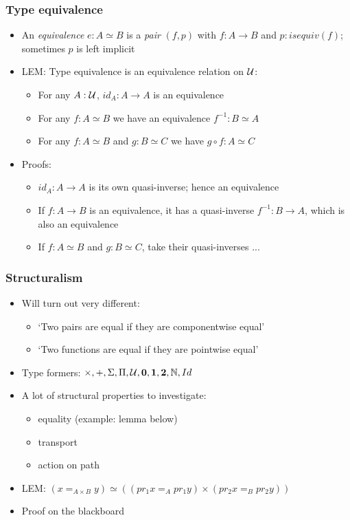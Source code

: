 \documentclass[handout]{beamer}
\newcommand{\Nat}{\mathbb{N}}
\newcommand{\UU}{{\cal U}}
\newcommand{\bfnull}{\mathbf{0}}
\newcommand{\bfone}{\mathbf{1}}
\newcommand{\bftwo}{\mathbf{2}}
\newcommand{\opp}[1]{\mathord{{#1}^{-1}}}
\begin{document}
\frame
  {

    \frametitle{Type equivalence}

    \begin{itemize}[<+->]
   \item An \emph{equivalence} $e:A\simeq B$ is a \emph{pair}
         $(f,p)$ with $f:A\to B$ and $p:isequiv(f)$; sometimes $p$ is left implicit
   \item LEM: Type equivalence is an equivalence relation on $\UU$:
      \begin{itemize}[<+->]
      \item For any $A:\UU$, $id_A: A\to A$ is an equivalence
      \item For any $f:A\simeq B$ we have an equivalence $\opp f:B\simeq A$
      \item For any $f:A\simeq B$ and $g:B\simeq C$  we have $g\circ f:A\simeq C$
      \end{itemize}
    \item Proofs:
        \begin{itemize}[<+->]
        \item $id_A: A\to A$ is its own quasi-inverse; hence an equivalence
        \item If $f:A\to B$ is an equivalence, it has a quasi-inverse $\opp f:B\to A$, which is also an equivalence
        \item If $f:A\simeq B$ and $g:B\simeq C$, take their quasi-inverses ...%
        \end{itemize}
    \end{itemize}
  }


  \frame
  {

    \frametitle{Structuralism}

    \begin{itemize}[<+->]
      \item Will turn out very different:
      \begin{itemize}[<+->]
         \item `Two pairs are equal if they are componentwise equal'
         \item `Two functions are equal if they are pointwise equal'
       \end{itemize}
    \item Type formers: $\times,+,\Sigma,\Pi,\UU,\bfnull,\bfone,\bftwo,\Nat,Id$
   \item A lot of structural properties to investigate:
      \begin{itemize}[<+->]
      \item equality (example: lemma below)
      \item transport
      \item action on path
      \end{itemize}
    \item LEM: $(x =_{A\times B} y) \simeq ((pr_1 x =_A pr_1 y) \times (pr_2 x =_B pr_2 y))$
    \item Proof on the blackboard
    \end{itemize}
  }
\end{document}
